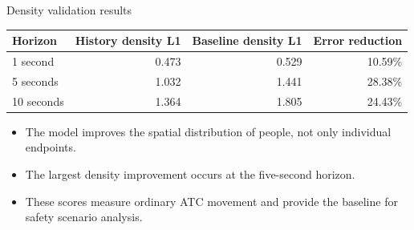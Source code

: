 \documentclass[aspectratio=169]{beamer}
\begin{document}
\begin{frame}{Density validation results}
\small
\centering
\renewcommand{\arraystretch}{1.35}
\begin{tabular}{lrrr}
\toprule
\textbf{Horizon} & \textbf{History density L1} & \textbf{Baseline density L1} & \textbf{Error reduction}\\
\midrule
1 second & 0.473 & 0.529 & 10.59\%\\
5 seconds & 1.032 & 1.441 & 28.38\%\\
10 seconds & 1.364 & 1.805 & 24.43\%\\
\bottomrule
\end{tabular}
\vspace{0.4cm}
\begin{itemize}
\item The model improves the spatial distribution of people, not only individual endpoints.
\item The largest density improvement occurs at the five-second horizon.
\item These scores measure ordinary ATC movement and provide the baseline for safety scenario analysis.
\end{itemize}
\end{frame}
\end{document}

